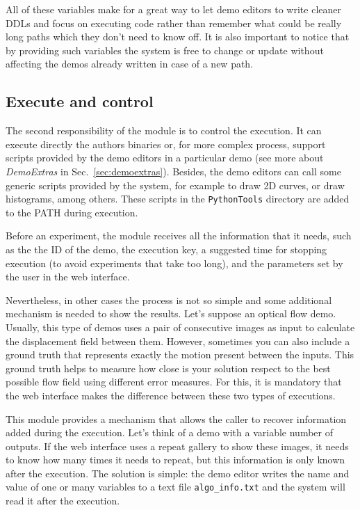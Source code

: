 All of these variables make for a great way to let demo editors to write cleaner DDLs and focus on executing code rather than remember what could be really long paths which they don't need to know off. It is also important to notice that by providing such variables the system is free to change or update without affecting the demos already written in case of a new path.


\subsection{Execute and control}
\noindent

The second responsibility of the module is to control the execution.  It can execute directly the authors binaries or, for more complex process, support scripts provided by the demo editors in a particular demo (see more about \textit{DemoExtras} in Sec.~\ref{sec:demoextras}). Besides, the demo editors can call some generic scripts provided by the system, for example to draw 2D curves, or draw histograms, among others. These scripts in the {\tt PythonTools} directory are added to the PATH during execution.

Before an experiment, the module receives all the information that it needs, such as the the ID of the demo, the execution key, a suggested time for stopping execution (to avoid experiments that take too long), and the parameters set by the user in the web interface.

Nevertheless, in other cases the process is not so simple and some additional mechanism is needed to show the results.  Let's suppose an optical flow demo. Usually, this type of demos uses a pair of consecutive images as input to calculate the displacement field between them. However, sometimes you can also include a ground truth that represents exactly the motion present between the inputs. This ground truth helps to measure how close is your solution respect to the best possible flow field using different error measures. For this, it is mandatory that the web interface makes the difference between these two types of executions. 


This module provides a mechanism that allows the caller to recover information added during the execution. Let's think of a demo with a variable number of outputs. If the web interface uses a repeat gallery to show these images, it needs to know how many times it needs to repeat, but this information is only known after the execution. The solution is simple: the demo editor writes the name and value of one or many variables to a text file {\tt algo\_info.txt} and the system will read it after the execution.


